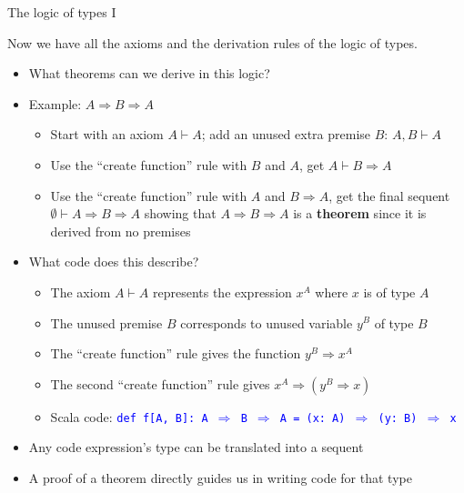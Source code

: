 \documentclass[english]{beamer}
\begin{document}
\begin{frame}{The logic of types I}

Now we have all the axioms and the derivation rules of the logic of
types.
\begin{itemize}
\item What theorems can we derive in this logic?
\item Example: $A\Rightarrow B\Rightarrow A$
\begin{itemize}
\item Start with an axiom $A\vdash A$; add an unused extra premise $B$:
$A,B\vdash A$
\item Use the ``create function'' rule with $B$ and $A$, get $A\vdash B\Rightarrow A$
\item Use the ``create function'' rule with $A$ and $B\Rightarrow A$,
get the final sequent $\emptyset\vdash A\Rightarrow B\Rightarrow A$
showing that $A\Rightarrow B\Rightarrow A$ is a \textbf{theorem}
since it is derived from no premises
\end{itemize}
\item What code does this describe?
\begin{itemize}
\item The axiom $A\vdash A$ represents the expression $x^{A}$ where $x$
is of type $A$
\item The unused premise $B$ corresponds to unused variable $y^{B}$ of
type $B$
\item The ``create function'' rule gives the function $y^{B}\Rightarrow x^{A}$
\item The second ``create function'' rule gives $x^{A}\Rightarrow\left(y^{B}\Rightarrow x\right)$
\item Scala code: \texttt{\textcolor{blue}{\footnotesize{}def f{[}A, B{]}:\ A
$\Rightarrow$ B $\Rightarrow$ A = (x:\ A) $\Rightarrow$ (y:\ B)
$\Rightarrow$ x}}{\footnotesize \par}
\end{itemize}
\item Any code expression's type can be translated into a sequent
\item A proof of a theorem directly guides us in writing code for that type
\end{itemize}
\end{frame}
\end{document}
